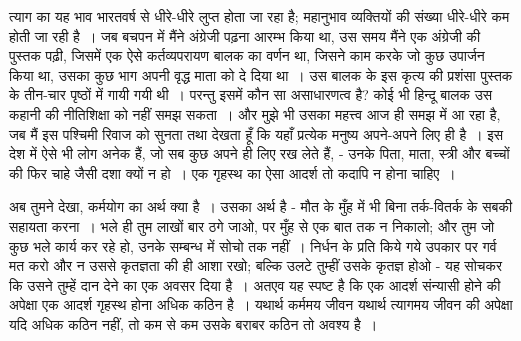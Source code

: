 त्याग का यह भाव भारतवर्ष से धीरे-धीरे लुप्त होता जा रहा है; महानुभाव व्यक्तियों की संख्या धीरे-धीरे कम होती जा रही है~। जब बचपन में मैंने अंग्रेजी पढ़ना आरम्भ किया था, उस समय मैंने एक अंग्रेजी की पुस्तक पढ़ी, जिसमें एक ऐसे कर्तव्यपरायण बालक का वर्णन था, जिसने काम करके जो कुछ उपार्जन किया था, उसका कुछ भाग अपनी वृद्ध माता को दे दिया था~। उस बालक के इस कृत्य की प्रशंसा पुस्तक के तीन-चार पृष्ठों में गायी गयी थी~। परन्तु इसमें कौन सा असाधारणत्व है? कोई भी हिन्दू बालक उस कहानी की नीतिशिक्षा को नहीं समझ सकता~। और मुझे भी उसका महत्त्व आज ही समझ में आ रहा है, जब मैं इस पश्चिमी रिवाज को सुनता तथा देखता हूँ कि यहाँ प्रत्येक मनुष्य अपने-अपने लिए ही है~। इस देश में ऐसे भी लोग अनेक हैं, जो सब कुछ अपने ही लिए रख लेते हैं, - उनके पिता, माता, स्त्री और बच्चों की फिर चाहे जैसी दशा क्यों न हो~। एक गृहस्थ का ऐसा आदर्श तो कदापि न होना चाहिए~।

अब तुमने देखा, कर्मयोग का अर्थ क्या है~। उसका अर्थ है - मौत के मुँह में भी बिना तर्क-वितर्क के सबकी सहायता करना~। भले ही तुम लाखों बार ठगे जाओ, पर मुँह से एक बात तक न निकालो; और तुम जो कुछ भले कार्य कर रहे हो, उनके सम्बन्ध में सोचो तक नहीं~। निर्धन के प्रति किये गये उपकार पर गर्व मत करो और न उससे कृतज्ञता की ही आशा रखो; बल्कि उलटे तुम्हीं उसके कृतज्ञ होओ - यह सोचकर कि उसने तुम्हें दान देने का एक अवसर दिया है~। अतएव यह स्पष्ट है कि एक आदर्श संन्यासी होने की अपेक्षा एक आदर्श गृहस्थ होना अधिक कठिन है~। यथार्थ कर्ममय जीवन यथार्थ त्यागमय जीवन की अपेक्षा यदि अधिक कठिन नहीं, तो कम से कम उसके बराबर कठिन तो अवश्य है~।

